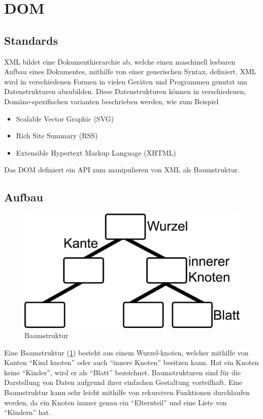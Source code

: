\section{\acl{DOM}}
\subsection{Standards}
\ac{XML} bildet eine Dokumenthierarchie ab, welche einen maschinell lesbaren Aufbau eines
Dokumentes, mithilfe von einer generischen Syntax, definiert. \ac{XML} wird in
verschiedenen Formen in vielen Geräten und Programmen genutzt um Datenstrukturen
abzubilden. Diese Datenstrukturen können in verschiedenen, Domäne-spezifischen
varianten beschrieben werden, wie zum Beispiel

\begin{itemize}
\item Scalable Vector Graphic (SVG)
\item Rich Site Summary (RSS)
\item Extensible Hypertext Markup Language (XHTML)
\end{itemize}

Das \ac{DOM} definiert ein \ac{API} zum manipulieren von \ac{XML} als
Baumstruktur. \cite{harold}

\subsection{Aufbau}
\begin{figure}
  \includegraphics[width=\linewidth]{images/binarytree.jpg}
  \caption{Baumstruktur}
  \label{fig:binarytree}
\end{figure}

Eine Baumstruktur (\ref{fig:binarytree}) besteht aus einem Wurzel-knoten,
welcher mithilfe von Kanten ``Kind knoten'' oder auch ``innere Knoten'' besitzen
kann. Hat ein Knoten keine ``Kinder'', wird er als ``Blatt'' bezeichnet.
Baumstrukturen sind für die Darstellung von Daten aufgrund ihrer einfachen
Gestaltung vorteilhaft. Eine Baumstruktur kann sehr leicht mithilfe von
rekursiven Funktionen durchlaufen werden, da ein Knoten immer genau ein
``Elternteil'' und eine Liste von ``Kindern'' hat.

